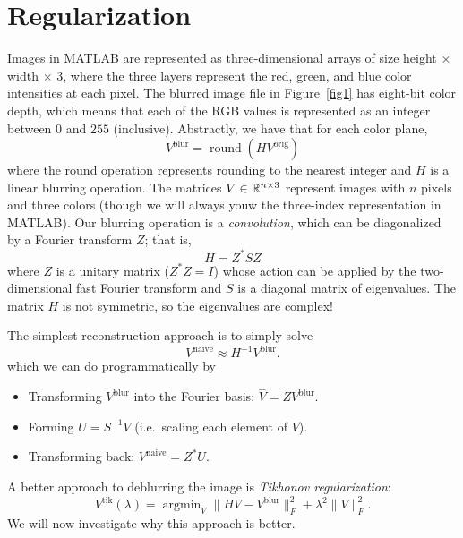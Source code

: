 \documentclass[12pt, leqno]{article} %
\begin{document}
\section{Regularization}

Images in MATLAB are represented as three-dimensional arrays of size
height $\times$ width $\times$ 3, where the three layers represent the
red, green, and blue color intensities at each pixel.  The blurred
image file in Figure~\ref{fig1} has eight-bit color depth, which means
that each of the RGB values is represented as an integer between $0$
and $255$ (inclusive).  Abstractly, we have that for each color plane,
\[
  V^{\mathrm{blur}} = \operatorname{round}(H V^{\mathrm{orig}})
\]
where the round operation represents rounding to the nearest integer
and $H$ is a linear blurring operation.  The matrices
$V \in \mathbb{R}^{n \times 3}$ represent images with $n$ pixels and three
colors (though we will always youw the three-index representation
in MATLAB).  Our blurring operation is
a {\em convolution}, which can be diagonalized by a Fourier transform $Z$;
that is,
\[
  H = Z^{*} S Z
\]
where $Z$ is a unitary matrix ($Z^* Z = I$) whose action can be applied
by the two-dimensional fast Fourier transform and $S$ is a diagonal
matrix of eigenvalues.  The matrix $H$ is not symmetric, so the
eigenvalues are complex!

The simplest reconstruction approach is to simply solve
\[
  V^{\mathrm{naive}} \approx H^{-1} V^{\mathrm{blur}}.
\]
which we can do programmatically by
\begin{itemize}
  \item Transforming $V^{\mathrm{blur}}$ into the Fourier basis:
    $\hat{V} = Z V^{\mathrm{blur}}$.
  \item Forming $U = S^{-1} V$ (i.e.~scaling each element of $V$).
  \item Transforming back: $V^{\mathrm{naive}} = Z^* U$.
\end{itemize}
A better approach to deblurring the image is {\em Tikhonov
  regularization}:
\[
  V^{\mathrm{tik}}(\lambda) =
  \operatorname{argmin}_V \|HV-V^{\mathrm{blur}}\|_F^2 + \lambda^2 \|V\|_F^2.
\]
We will now investigate why this approach is better.
\end{document}

